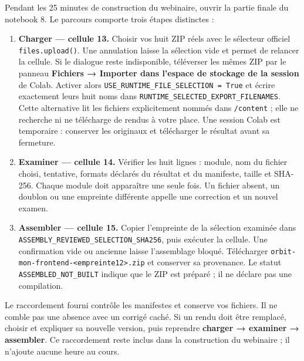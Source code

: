 \documentclass[
  canadien,
  11pt,
  a4paper,
]{report}
\providecommand{\tightlist}{%
  \setlength{\itemsep}{0pt}\setlength{\parskip}{0pt}}
\begin{document}
Pendant les 25 minutes de construction du webinaire, ouvrir la partie
finale du notebook 8. Le parcours comporte trois étapes distinctes :

\begin{enumerate}
\def\labelenumi{\arabic{enumi}.}
\tightlist
\item
  \textbf{Charger --- cellule 13.} Choisir vos huit ZIP réels avec le
  sélecteur officiel \texttt{files.upload()}. Une annulation laisse la
  sélection vide et permet de relancer la cellule. Si le dialogue reste
  indisponible, téléverser les mêmes ZIP par le panneau \textbf{Fichiers
  → Importer dans l'espace de stockage de la session} de Colab. Activer
  alors \texttt{USE\_\allowbreak{}RUNTIME\_\allowbreak{}FILE\_\allowbreak{}SELECTION\ =\ True} et écrire
  exactement leurs huit noms dans
  \texttt{RUNTIME\_\allowbreak{}SELECTED\_\allowbreak{}EXPORT\_\allowbreak{}FILENAMES}. Cette alternative lit
  les fichiers explicitement nommés dans \texttt{/\allowbreak{}content} ; elle ne
  recherche ni ne télécharge de rendus à votre place. Une session Colab
  est temporaire : conserver les originaux et télécharger le résultat
  avant sa fermeture.
\item
  \textbf{Examiner --- cellule 14.} Vérifier les huit lignes : module,
  nom du fichier choisi, tentative, formats déclarés du résultat et du
  manifeste, taille et SHA-256. Chaque module doit apparaître une seule
  fois. Un fichier absent, un doublon ou une empreinte différente
  appelle une correction et un nouvel examen.
\item
  \textbf{Assembler --- cellule 15.} Copier l'empreinte de la sélection
  examinée dans \texttt{ASSEMBLY\_\allowbreak{}REVIEWED\_\allowbreak{}SELECTION\_\allowbreak{}SHA256}, puis
  exécuter la cellule. Une confirmation vide ou ancienne laisse
  l'assemblage bloqué. Télécharger
  \texttt{orbit-mon-frontend-\textless{}empreinte12\textgreater{}.zip}
  et conserver sa provenance. Le statut \texttt{ASSEMBLED\_\allowbreak{}NOT\_\allowbreak{}BUILT}
  indique que le ZIP est préparé ; il ne déclare pas une compilation.
\end{enumerate}

Le raccordement fourni contrôle les manifestes et conserve vos fichiers.
Il ne comble pas une absence avec un corrigé caché. Si un rendu doit
être remplacé, choisir et expliquer sa nouvelle version, puis reprendre
\textbf{charger → examiner → assembler}. Ce raccordement reste inclus
dans la construction du webinaire ; il n'ajoute aucune heure au cours.
\end{document}
